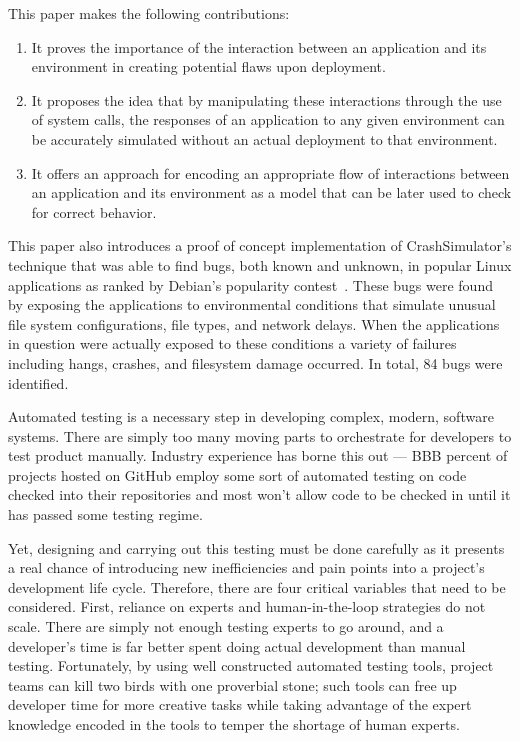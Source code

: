 This paper makes the following contributions:

\begin{enumerate}
\item{It proves the importance of the interaction between an application
and its environment in creating potential flaws upon deployment.}

\item{It proposes the idea that by manipulating these interactions through
the use of system calls, the responses of an application to any given
environment can be accurately simulated without an actual
deployment to that environment.}

\item{It offers an approach for encoding an appropriate flow of
interactions between an application and its environment as a model that
can be later used to check for correct behavior.}
\end{enumerate}

This paper also introduces a proof of concept implementation of
CrashSimulator's technique that was able to find bugs, both known and
unknown, in popular Linux applications as ranked by Debian's popularity
contest~\cite{DebPopCon}.  These bugs were found by exposing the
applications to environmental conditions that simulate unusual file system
configurations, file types, and network delays.  When the applications in
question were actually exposed to these conditions a variety of failures
including hangs, crashes, and filesystem damage occurred.  In total, 84
bugs were identified.


 Automated testing
is a necessary step in developing complex, modern, software systems.  There
are simply too many moving parts to orchestrate for developers to test
product manually.
Industry experience has borne this out --- BBB percent of projects hosted
on GitHub employ some sort of automated testing on code checked into their
repositories and most won't allow code to be checked in until it has passed
some testing regime.

Yet, designing and carrying out this testing must be done carefully as it
presents a real chance of introducing new inefficiencies and pain points
into a project's development life cycle.  Therefore, there are four
critical variables that need to be considered.
First, reliance on experts and
human-in-the-loop strategies do not scale.  There are
simply not enough testing experts to go around,
and a developer's time is far
better spent doing actual development than manual testing.  Fortunately, by using well constructed automated
testing tools, project teams can kill two birds with one proverbial stone;
such tools can free up developer time for more creative tasks while taking
advantage of the expert knowledge encoded in the tools to temper the
shortage of human experts.

